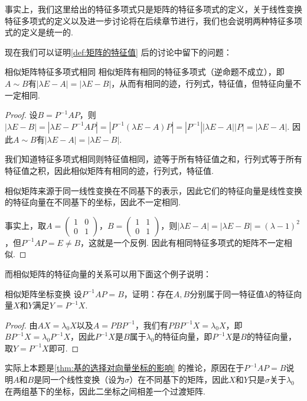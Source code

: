 事实上，我们这里给出的特征多项式只是矩阵的特征多项式的定义，关于线性变换特征多项式的定义以及进一步讨论将在后续章节进行，我们也会说明两种特征多项式的定义是统一的.

现在我们可以证明\autoref{def:矩阵的特征值} 后的讨论中留下的问题：
\begin{theorem}{}{相似矩阵特征多项式相同}
    相似矩阵有相同的特征多项式（逆命题不成立），即$A\sim B$有$|\lambda E-A|=|\lambda E-B|$，从而有相同的迹，行列式，特征值，但特征向量不一定相同.
\end{theorem}
\begin{proof}
    设$B=P^{-1}AP$，则$|\lambda E-B|=|\lambda E-P^{-1}AP|=|P^{-1}(\lambda E-A)P|=|P^{-1}||\lambda E-A||P|=|\lambda E-A|$. 因此$A\sim B$有$|\lambda E-A|=|\lambda E-B|$.

    我们知道特征多项式相同则特征值相同，迹等于所有特征值之和，行列式等于所有特征值之积，因此相似矩阵有相同的迹，行列式，特征值.

    相似矩阵来源于同一线性变换在不同基下的表示，因此它们的特征向量是线性变换的特征向量在不同基下的坐标，因此不一定相同.

    事实上，取$A=\begin{pmatrix}
        1 & 0 \\
        0 & 1
    \end{pmatrix}$，$B=\begin{pmatrix}
        1 & 1 \\
        0 & 1
    \end{pmatrix}$，则$|\lambda E-A|=|\lambda E-B|=(\lambda-1)^2$，但$P^{-1}AP=E\neq B$，这就是一个反例. 因此有相同特征多项式的矩阵不一定相似.
\end{proof}

而相似矩阵的特征向量的关系可以用下面这个例子说明：
\begin{example}{}{相似矩阵坐标变换}
    设$P^{-1}AP=B$，证明：存在$A,B$分别属于同一特征值$\lambda$的特征向量$X$和$Y$满足$Y=P^{-1}X$.
\end{example}

\begin{proof}
    由$AX=\lambda_0 X$以及$A=PBP^{-1}$，我们有$PBP^{-1}X=\lambda_0 X$，即$BP^{-1}X=\lambda_0 P^{-1}X$，因此$P^{-1}X$是$B$属于$\lambda_0$的特征向量，即$P^{-1}X$是$B$的特征向量，取$Y=P^{-1}X$即可.
\end{proof}

实际上本题是\autoref{thm:基的选择对向量坐标的影响} 的推论，原因在于$P^{-1}AP=B$说明$A$和$B$是同一个线性变换（设为$\sigma$）在不同基下的矩阵，因此$X$和$Y$只是$\sigma$关于$\lambda_0$在两组基下的坐标，因此二坐标之间相差一个过渡矩阵.

